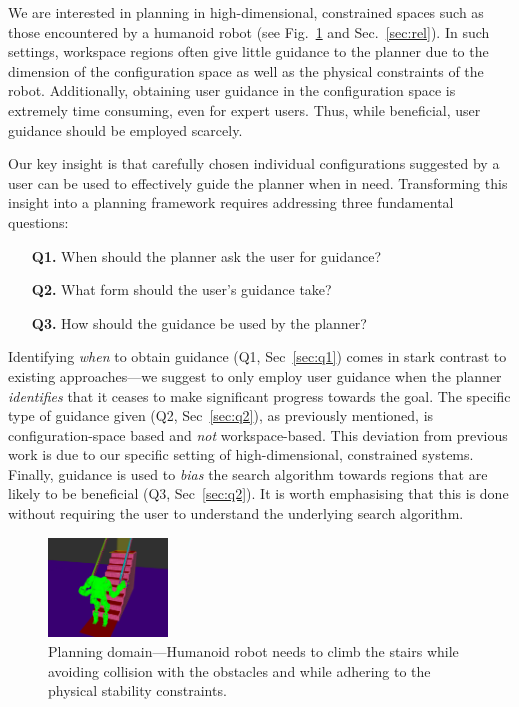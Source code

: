 \documentclass[conference]{IEEEtran}
\begin{document}
We are interested in planning in high-dimensional, constrained spaces such as those encountered by a humanoid robot (see Fig.~\ref{fig:robot} and Sec.~\ref{sec:rel}).
In such settings, workspace regions often give little guidance to the planner due to the dimension of the configuration space as well as the physical constraints of the robot.
Additionally, obtaining user guidance in the configuration space is extremely time consuming, even for expert users.
Thus,  while beneficial, user guidance should be employed scarcely.

Our key insight is that carefully chosen individual configurations suggested by a user can be used to effectively guide the planner when in need.
Transforming this insight into a planning framework requires addressing three fundamental questions:

\begin{itemize}
	\item[\textbf{Q1.}] When should the planner ask the user for guidance?
	\item[\textbf{Q2.}] What form should the user's guidance take?
	\item[\textbf{Q3.}] How should the guidance be used by the planner?
\end{itemize}

Identifying \emph{when} to obtain guidance 
(Q1, Sec~\ref{sec:q1}) 
comes in stark contrast to existing approaches---we suggest to only employ user guidance when the planner \emph{identifies} that it ceases to make significant progress towards the goal.
The specific type of guidance given 
(Q2, Sec~\ref{sec:q2}),
as previously mentioned,
is configuration-space based and \emph{not} workspace-based. This deviation from previous work is due to our specific setting of high-dimensional, constrained systems.
Finally, guidance is used to \emph{bias} the search algorithm towards regions that are likely to be beneficial (Q3, Sec~\ref{sec:q2}). 
It is worth emphasising that this is done without requiring the user to understand the underlying search algorithm. 

% 

\begin{figure}[tb]
  \centering
  	\includegraphics[width=0.283\textwidth]{fig/workspace.png}
  	\vspace{-2mm}
  \caption{
		Planning domain---Humanoid robot needs to climb the stairs while avoiding collision with the obstacles and while adhering to the physical stability constraints.
  	}
   	\label{fig:robot}
\end{figure}
\end{document}
